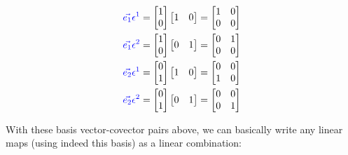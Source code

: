 \begin{align*}
    \color{blue} \vec{e_1} \epsilon^1 &= 
    \begin{bmatrix}
        1\\
        0
    \end{bmatrix}
    \begin{bmatrix}
        1 & 0
    \end{bmatrix} = 
    \begin{bmatrix}
        1 & 0\\
        0 & 0
    \end{bmatrix}\\
    \color{blue} \vec{e_1} \epsilon^2 &= 
    \begin{bmatrix}
        1\\
        0
    \end{bmatrix}
    \begin{bmatrix}
        0 & 1
    \end{bmatrix} = 
    \begin{bmatrix}
        0 & 1\\
        0 & 0
    \end{bmatrix}\\
    \color{blue} \vec{e_2} \epsilon^1 &= 
    \begin{bmatrix}
        0\\
        1
    \end{bmatrix}
    \begin{bmatrix}
        1 & 0
    \end{bmatrix} = 
    \begin{bmatrix}
        0 & 0\\
        1 & 0
    \end{bmatrix}\\
    \color{blue} \vec{e_2} \epsilon^2 &= 
    \begin{bmatrix}
        0\\
        1
    \end{bmatrix}
    \begin{bmatrix}
        0 & 1
    \end{bmatrix} = 
    \begin{bmatrix}
        0 & 0\\
        0 & 1
    \end{bmatrix}
\end{align*}

With these basis vector-covector pairs above, we can basically write any linear maps (using indeed this basis) as a linear
combination:

